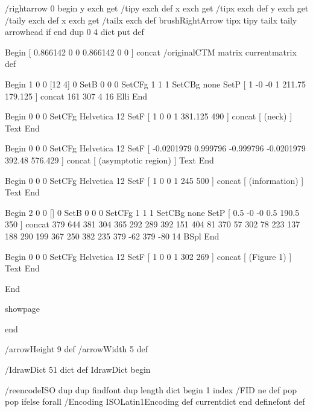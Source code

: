 /rightarrow {
0 begin
y exch get /tipy exch def
x exch get /tipx exch def
y exch get /taily exch def
x exch get /tailx exch def
brushRightArrow { tipx tipy tailx taily arrowhead } if
end
} dup 0 4 dict put def




Begin
[ 0.866142 0 0 0.866142 0 0 ] concat
/originalCTM matrix currentmatrix def

Begin %
1 0 0 [12 4] 0 SetB
0 0 0 SetCFg
1 1 1 SetCBg
none SetP %
[ 1 -0 -0 1 211.75 179.125 ] concat
161 307 4 16 Elli
End

Begin %
0 0 0 SetCFg
Helvetica 12 SetF
[ 1 0 0 1 381.125 490 ] concat
[
(neck)
] Text
End

Begin %
0 0 0 SetCFg
Helvetica 12 SetF
[ -0.0201979 0.999796 -0.999796 -0.0201979 392.48 576.429 ] concat
[
(asymptotic region)
] Text
End

Begin %
0 0 0 SetCFg
Helvetica 12 SetF
[ 1 0 0 1 245 500 ] concat
[
(information)
] Text
End

Begin %
2 0 0 [] 0 SetB
0 0 0 SetCFg
1 1 1 SetCBg
none SetP %
[ 0.5 -0 -0 0.5 190.5 350 ] concat
379 644
381 304
365 292
289 392
151 404
81 370
57 302
78 223
137 188
290 199
367 250
382 235
379 -62
379 -80
14 BSpl
End

Begin %
0 0 0 SetCFg
Helvetica 12 SetF
[ 1 0 0 1 302 269 ] concat
[
(Figure 1)
] Text
End

End %

showpage


end




/arrowHeight 9 def
/arrowWidth 5 def

/IdrawDict 51 dict def
IdrawDict begin

/reencodeISO {
dup dup findfont dup length dict begin
{ 1 index /FID ne { def }{ pop pop } ifelse } forall
/Encoding ISOLatin1Encoding def
currentdict end definefont
} def

